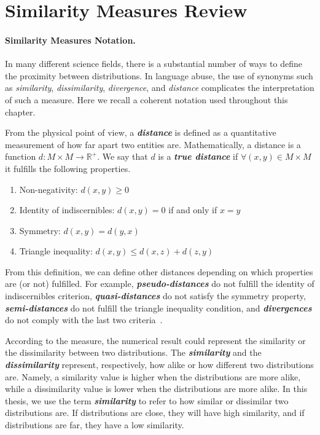 \section{Similarity Measures Review}\label{sec:measures}

\paragraph{Similarity Measures Notation.}
In many different science fields, there is a substantial number of ways to define the proximity between distributions. In language abuse, the use of synonyms such as \textit{similarity}, \textit{dissimilarity}, \textit{divergence}, and \textit{distance} complicates the interpretation of such a measure. Here we recall a coherent notation used throughout this chapter.

From the physical point of view, a \textbf{\textit{distance}} is defined as a quantitative measurement of how far apart two entities are. Mathematically, a distance is a function $d : M \times M \rightarrow \mathbb{R}^+$. We say that $d$ is a \textbf{\textit{true distance}} if $\forall (x, y) \in M \times M$ it fulfills the following properties.

\begin{enumerate}%
 \item Non-negativity: $d(x, y)\geq 0$
 \item Identity of indiscernibles: $d(x, y) = 0$ if and only if $x = y$
 \item Symmetry: $d(x, y) = d(y, x)$
 \item Triangle inequality: $d(x, y) \leq d(x, z) + d(z, y)$
\end{enumerate}

From this definition, we can define other distances depending on which properties are (or not) fulfilled. For example, \textbf{\textit{pseudo-distances}} do not fulfill the identity of indiscernibles criterion, \textbf{\textit{quasi-distances}} do not satisfy the symmetry property, \textbf{\textit{semi-distances}} do not fulfill the triangle inequality condition, and \textbf{\textit{divergences}} do not comply with the last two criteria~\citep{Khamsi:JFPTA:2015}.

According to the measure, the numerical result could represent the similarity or the dissimilarity between two distributions. The \textbf{\textit{similarity}} and the \textbf{\textit{dissimilarity}} represent, respectively, how alike or how different two distributions are. Namely, a similarity value is higher when the distributions are more alike, while a dissimilarity value is lower when the distributions are more alike. In this thesis, we use the term \textbf{\textit{similarity}} to refer to how similar or dissimilar two distributions are. If distributions are close, they will have high similarity, and if distributions are far, they have a low similarity.
 

